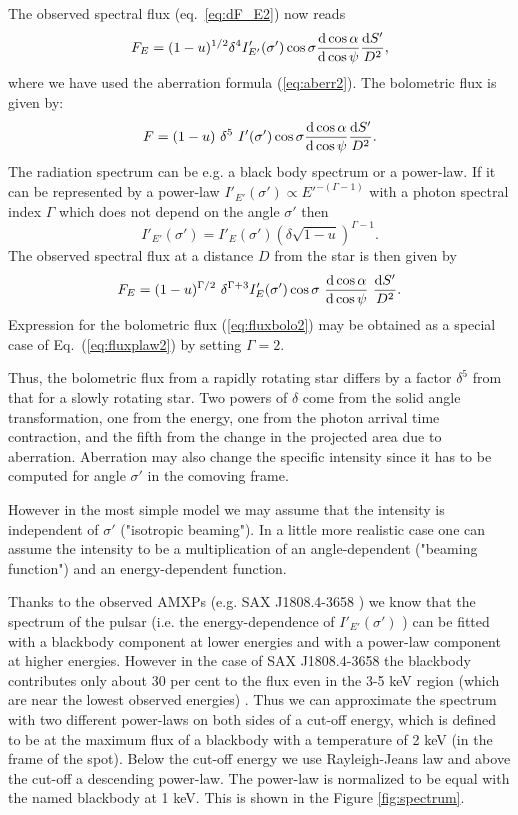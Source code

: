 \documentclass{wihuri}
\def\be{\begin{equation}}
\def\ee{\end{equation}}
\def\d{{\rm d}}
\def\Dop{\delta}
\begin{document}
The observed spectral flux (eq.~\ref{eq:dF_E2}) now reads
\be \label{eq:fluxspot2}
F_{E}=(1-u)^{1/2} \Dop^{4} I'_{E'}(\sigma') \cos\sigma
\frac{\d \cos\alpha}{\d\cos\psi}
 \frac{\d S'}{D^2} ,
\ee
where we have used the aberration formula (\ref{eq:aberr2}).
The bolometric flux is given by:
\be  \label{eq:fluxbolo2}
F= (1-u)\ \Dop^5 \
I'(\sigma')  \cos\sigma \frac{\d\cos\alpha}{\d\cos\psi} \frac{\d S'}{D^2} .
\ee
The radiation spectrum can be e.g. a black body spectrum or a power-law. If it can be represented by
a power-law $I'_{E'}(\sigma') \propto E '^{-(\Gamma-1)}$
with a photon spectral index
$\Gamma$ which does not depend on the angle $\sigma'$ then
\be \label{eq:int_trans2}
I'_{E'}(\sigma') = I'_{E}(\sigma')
\left( \Dop \sqrt{1-u} \right)^{\Gamma-1} .
\ee
The observed spectral flux at a distance $D$ from the star is then given by 
\be\label{eq:fluxplaw2}
 F_{E}= (1-u)^{\Gamma/2}\ \Dop^{\Gamma+3} I'_E(\sigma')
\cos\sigma\ \frac{\d\cos\alpha}{\d\cos\psi}\ \frac{\d S'}{D^2}.
\ee
Expression for the bolometric flux (\ref{eq:fluxbolo2})
may be obtained as a special case of Eq.~(\ref{eq:fluxplaw2}) by setting $\Gamma=2$. 

Thus, the bolometric flux from a rapidly rotating star differs by a factor  $\Dop^5$
from that for a slowly rotating star. Two powers of $\Dop$ come
from the solid angle transformation, one from the energy, one from the
photon arrival time contraction,
and the fifth from the change in the projected  area due to  aberration.
Aberration may also change the specific intensity since it has to be computed
for angle $\sigma'$ in the comoving frame. 

However in the most simple model we may assume that the intensity is independent of $\sigma'$ ("isotropic beaming"). In a little more realistic case one can assume the intensity to be a multiplication of an angle-dependent ("beaming function") and an energy-dependent function.

Thanks to the observed AMXPs (e.g. SAX J1808.4-3658 \cite{poutagierlinskisax}) we know that the spectrum of the pulsar (i.e. the energy-dependence of $I'_{E'}(\sigma')$ ) can be fitted with a blackbody component at lower energies and with a power-law component at higher energies. However in the case of SAX J1808.4-3658 the blackbody contributes only about 30 per cent to the flux even in the 3-5 keV region (which are near the lowest observed energies) \cite{poutagierlinskisax}. Thus we can approximate the spectrum with two different power-laws on both sides of a cut-off energy, which is defined to be at the maximum flux of a blackbody with a temperature of 2 keV (in the frame of the spot). Below the cut-off energy we use Rayleigh-Jeans law and above the cut-off a descending power-law. The power-law is normalized to be equal with the named blackbody at 1 keV. This is shown in the Figure \ref{fig:spectrum}.
\end{document}
